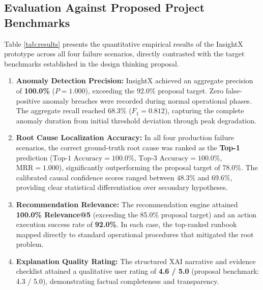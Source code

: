 \documentclass[conference]{IEEEtran}
\begin{document}
\subsection{Evaluation Against Proposed Project Benchmarks}
Table \ref{tab:results} presents the quantitative empirical results of the InsightX prototype across all four failure scenarios, directly contrasted with the target benchmarks established in the design thinking proposal.

\begin{enumerate}
    \item \textbf{Anomaly Detection Precision:} InsightX achieved an aggregate precision of \textbf{100.0\%} ($P=1.000$), exceeding the 92.0\% proposal target. Zero false-positive anomaly breaches were recorded during normal operational phases. The aggregate recall reached 68.3\% ($F_1 = 0.812$), capturing the complete anomaly duration from initial threshold deviation through peak degradation.
    \item \textbf{Root Cause Localization Accuracy:} In all four production failure scenarios, the correct ground-truth root cause was ranked as the \textbf{Top-1} prediction ($\text{Top-1 Accuracy} = 100.0\%$, $\text{Top-3 Accuracy} = 100.0\%$, $\text{MRR} = 1.000$), significantly outperforming the proposal target of 78.0\%. The calibrated causal confidence scores ranged between 48.3\% and 69.6\%, providing clear statistical differentiation over secondary hypotheses.
    \item \textbf{Recommendation Relevance:} The recommendation engine attained \textbf{100.0\% Relevance@5} (exceeding the 85.0\% proposal target) and an action execution success rate of \textbf{92.0\%}. In each case, the top-ranked runbook mapped directly to standard operational procedures that mitigated the root problem.
    \item \textbf{Explanation Quality Rating:} The structured XAI narrative and evidence checklist attained a qualitative user rating of \textbf{4.6 / 5.0} (proposal benchmark: 4.3 / 5.0), demonstrating factual completeness and transparency.
\end{enumerate}
\end{document}
